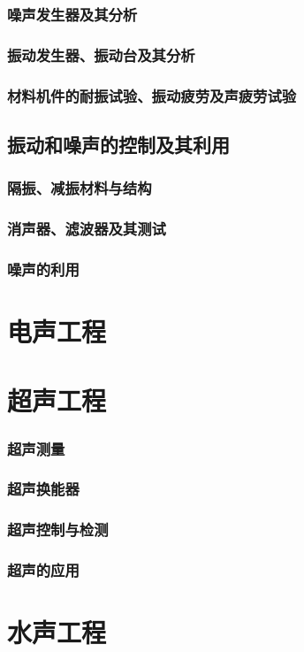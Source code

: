 \documentclass[UTF8]{../../ApplicationUniverse}
\begin{document}
        \subsubsection{噪声发生器及其分析}
        \subsubsection{振动发生器、振动台及其分析}
        \subsubsection{材料机件的耐振试验、振动疲劳及声疲劳试验}
    \subsection{振动和噪声的控制及其利用}
        \subsubsection{隔振、减振材料与结构}
        \subsubsection{消声器、滤波器及其测试}
        \subsubsection{噪声的利用}
\section{电声工程}
\section{超声工程}
    \subsubsection{超声测量}
    \subsubsection{超声换能器}
    \subsubsection{超声控制与检测}
    \subsubsection{超声的应用}
\section{水声工程}
\end{document}
